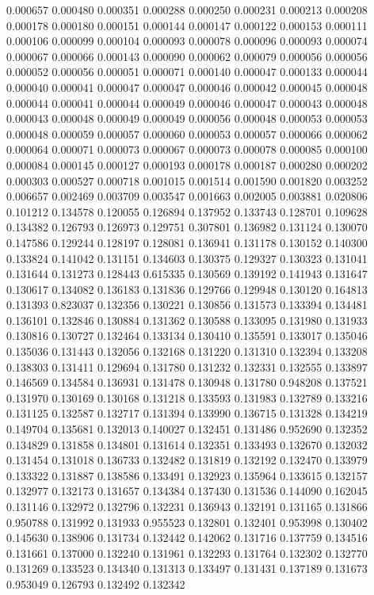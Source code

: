 0.000657
0.000480
0.000351
0.000288
0.000250
0.000231
0.000213
0.000208
0.000178
0.000180
0.000151
0.000144
0.000147
0.000122
0.000153
0.000111
0.000106
0.000099
0.000104
0.000093
0.000078
0.000096
0.000093
0.000074
0.000067
0.000066
0.000143
0.000090
0.000062
0.000079
0.000056
0.000056
0.000052
0.000056
0.000051
0.000071
0.000140
0.000047
0.000133
0.000044
0.000040
0.000041
0.000047
0.000047
0.000046
0.000042
0.000045
0.000048
0.000044
0.000041
0.000044
0.000049
0.000046
0.000047
0.000043
0.000048
0.000043
0.000048
0.000049
0.000049
0.000056
0.000048
0.000053
0.000053
0.000048
0.000059
0.000057
0.000060
0.000053
0.000057
0.000066
0.000062
0.000064
0.000071
0.000073
0.000067
0.000073
0.000078
0.000085
0.000100
0.000084
0.000145
0.000127
0.000193
0.000178
0.000187
0.000280
0.000202
0.000303
0.000527
0.000718
0.001015
0.001514
0.001590
0.001820
0.003252
0.006657
0.002469
0.003709
0.003547
0.001663
0.002005
0.003881
0.020806
0.101212
0.134578
0.120055
0.126894
0.137952
0.133743
0.128701
0.109628
0.134382
0.126793
0.126973
0.129751
0.307801
0.136982
0.131124
0.130070
0.147586
0.129244
0.128197
0.128081
0.136941
0.131178
0.130152
0.140300
0.133824
0.141042
0.131151
0.134603
0.130375
0.129327
0.130323
0.131041
0.131644
0.131273
0.128443
0.615335
0.130569
0.139192
0.141943
0.131647
0.130617
0.134082
0.136183
0.131836
0.129766
0.129948
0.130120
0.164813
0.131393
0.823037
0.132356
0.130221
0.130856
0.131573
0.133394
0.134481
0.136101
0.132846
0.130884
0.131362
0.130588
0.133095
0.131980
0.131933
0.130816
0.130727
0.132464
0.133134
0.130410
0.135591
0.133017
0.135046
0.135036
0.131443
0.132056
0.132168
0.131220
0.131310
0.132394
0.133208
0.138303
0.131411
0.129694
0.131780
0.131232
0.132331
0.132555
0.133897
0.146569
0.134584
0.136931
0.131478
0.130948
0.131780
0.948208
0.137521
0.131970
0.130169
0.130168
0.131218
0.133593
0.131983
0.132789
0.133216
0.131125
0.132587
0.132717
0.131394
0.133990
0.136715
0.131328
0.134219
0.149704
0.135681
0.132013
0.140027
0.132451
0.131486
0.952690
0.132352
0.134829
0.131858
0.134801
0.131614
0.132351
0.133493
0.132670
0.132032
0.131454
0.131018
0.136733
0.132482
0.131819
0.132192
0.132470
0.133979
0.133322
0.131887
0.138586
0.133491
0.132923
0.135964
0.133615
0.132157
0.132977
0.132173
0.131657
0.134384
0.137430
0.131536
0.144090
0.162045
0.131146
0.132972
0.132796
0.132231
0.136943
0.132191
0.131165
0.131866
0.950788
0.131992
0.131933
0.955523
0.132801
0.132401
0.953998
0.130402
0.145630
0.138906
0.131734
0.132442
0.142062
0.131716
0.137759
0.134516
0.131661
0.137000
0.132240
0.131961
0.132293
0.131764
0.132302
0.132770
0.131269
0.133523
0.134340
0.131313
0.133497
0.131431
0.137189
0.131673
0.953049
0.126793
0.132492
0.132342
